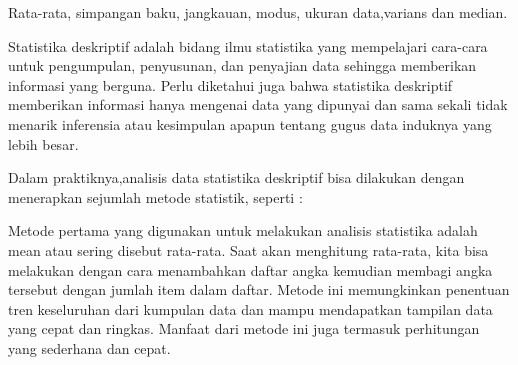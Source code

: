 \documentclass[a4paper,10pt]{article}
\begin{document}
\begin{eulernotebook}
\begin{eulercomment}
\begin{eulercomment}
\begin{eulercomment}
\begin{eulercomment}
\begin{eulercomment}
\begin{eulercomment}
\begin{eulercomment}
\begin{eulercomment}
\begin{eulercomment}
\begin{eulercomment}
\begin{eulercomment}
\begin{eulercomment}
\begin{eulerudf}
  
\end{eulerudf}
\begin{eulercomment}
Rata-rata, simpangan baku, jangkauan, modus, ukuran data,varians dan
median.\\
\begin{eulercomment}
\begin{eulercomment}
Statistika deskriptif adalah bidang ilmu statistika yang mempelajari
cara-cara untuk pengumpulan, penyusunan, dan penyajian data sehingga
memberikan informasi yang berguna. Perlu diketahui juga bahwa
statistika deskriptif memberikan informasi hanya mengenai data yang
dipunyai dan sama sekali tidak menarik inferensia atau kesimpulan
apapun tentang gugus data induknya yang lebih besar.

Dalam praktiknya,analisis data statistika deskriptif bisa dilakukan
dengan menerapkan sejumlah metode statistik, seperti :

\end{eulercomment}
\begin{eulercomment}
Metode pertama yang digunakan untuk melakukan analisis statistika
adalah mean atau sering disebut rata-rata. Saat akan menghitung
rata-rata, kita bisa melakukan dengan cara menambahkan daftar angka
kemudian membagi angka tersebut dengan jumlah item dalam daftar.
Metode ini memungkinkan penentuan tren keseluruhan dari kumpulan data
dan mampu mendapatkan tampilan data yang cepat dan ringkas. Manfaat
dari metode ini juga termasuk perhitungan yang sederhana dan cepat.


\end{eulercomment}
\end{eulercomment}
\end{eulercomment}
\end{eulercomment}
\end{eulercomment}
\end{eulercomment}
\end{eulercomment}
\end{eulercomment}
\end{eulercomment}
\end{eulercomment}
\end{eulercomment}
\end{eulercomment}
\end{eulercomment}
\end{eulercomment}
\end{eulercomment}
\end{eulernotebook}
\end{document}
